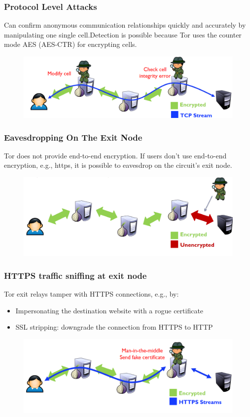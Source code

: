 \documentclass[10pt,a4paper]{report}
\begin{document}
\subsubsection{Protocol Level Attacks}
Can confirm anonymous communication relationships quickly and accurately by manipulating one single cell.Detection is possible because Tor uses the counter mode AES (AES-CTR) for encrypting cells.
\begin{figure}[H]
\centering
\includegraphics[scale=0.3]{23.png}
\end{figure}
\subsubsection{Eavesdropping On The Exit Node}
Tor does not provide end-to-end encryption. If users don’t use end-to-end encryption, e.g., https, it is possible to eavesdrop on the circuit’s exit node.
\begin{figure}[H]
\centering
\includegraphics[scale=0.3]{24.png}
\end{figure}
\subsubsection{HTTPS traffic sniffing at exit node}
Tor exit relays tamper with HTTPS connections, e.g., by:
\begin{itemize}
\item Impersonating the destination website with a rogue certificate
\item SSL stripping: downgrade the connection from HTTPS to HTTP
\end{itemize}
\begin{figure}[H]
\centering
\includegraphics[scale=0.3]{25.png}
\end{figure}
\end{document}
